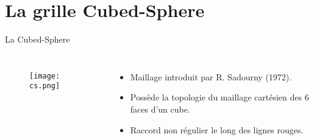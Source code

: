 \documentclass[11pt]{beamer}
\begin{document}

\section{La grille Cubed-Sphere}
\begin{frame}{La Cubed-Sphere}
\begin{columns}
\begin{figure}[htbp]
\begin{center}
\texttt{[image: cs.png]}\\

\end{center}
\end{figure}

\begin{itemize}
\item Maillage introduit par R. Sadourny (1972).
\vspace{5mm}

\item Possède la topologie du maillage cartésien des 6 faces d'un cube.
\vspace{5mm}

\item Raccord non régulier le long des lignes rouges.
\end{itemize}

\end{columns}
\end{frame}
\end{document}

